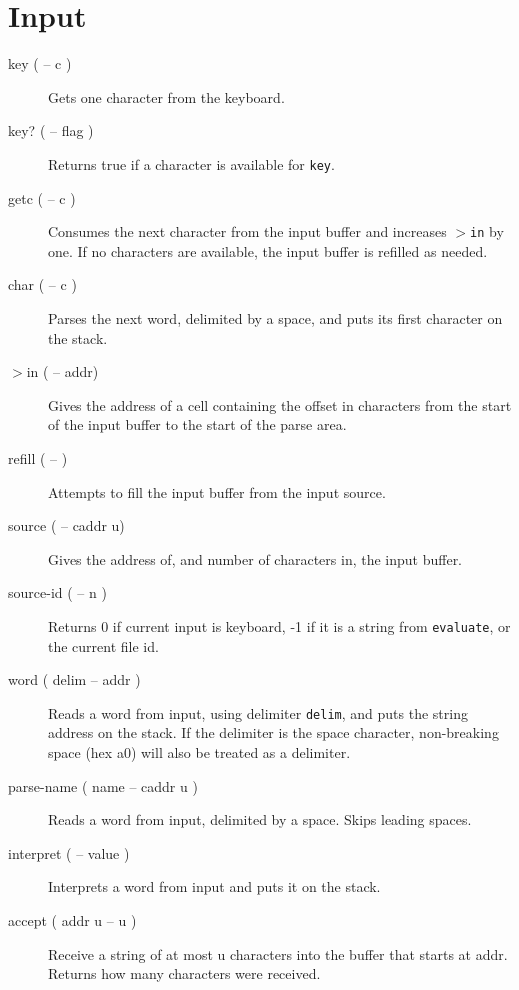 \section{Input}

\begin{description}

\item[key ( -- c )] Gets one character from the keyboard.
\item[key? ( -- flag )] Returns true if a character is available for \texttt{key}.
\item[getc ( -- c )] Consumes the next character from the input buffer and increases \texttt{$>$in} by one. If no characters are available, the input buffer is refilled as needed.

\item[char ( -- c )] Parses the next word, delimited by a space, and puts its first character on the stack.

\item[$>$in ( -- addr)] Gives the address of a cell containing the offset in characters from the start of the input buffer to the start of the parse area.

\item[refill ( -- )] Attempts to fill the input buffer from the input source.

\item[source ( -- caddr u)] Gives the address of, and number of characters in, the input buffer.
\item[source-id ( -- n )] Returns 0 if current input is keyboard, -1 if it is a string from \texttt{evaluate}, or the current file id.

\item[word ( delim -- addr )] Reads a word from input, using delimiter \texttt{delim}, and puts the string address on the stack. If the delimiter is the space character, non-breaking space (hex a0) will also be treated as a delimiter.

\item[parse-name ( name -- caddr u )] Reads a word from input, delimited by a space. Skips leading spaces. 

\item[interpret ( -- value )] Interprets a word from input and puts it on the stack.

\item[accept ( addr u -- u )] Receive a string of at most u characters into the buffer that starts at addr. Returns how many characters were received.


\end{description}
